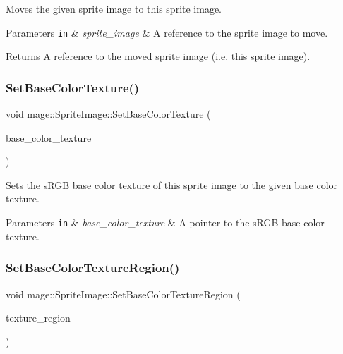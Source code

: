 Moves the given sprite image to this sprite image.


\begin{DoxyParams}[1]{Parameters}
\mbox{\tt in}  & {\em sprite\+\_\+image} & A reference to the sprite image to move. \\
\hline
\end{DoxyParams}
\begin{DoxyReturn}{Returns}
A reference to the moved sprite image (i.\+e. this sprite image). 
\end{DoxyReturn}
\hypertarget{classmage_1_1_sprite_image_a9fb3a39de1350e58b4019b541337ca13}{}\label{classmage_1_1_sprite_image_a9fb3a39de1350e58b4019b541337ca13} 
\subsubsection{\texorpdfstring{Set\+Base\+Color\+Texture()}{SetBaseColorTexture()}}
{\footnotesize\ttfamily void mage\+::\+Sprite\+Image\+::\+Set\+Base\+Color\+Texture (\begin{DoxyParamCaption}\item[{\hyperlink{namespacemage_a1e01ae66713838a7a67d30e44c67703e}{Shared\+Ptr}$<$ const \hyperlink{classmage_1_1_texture}{Texture} $>$}]{base\+\_\+color\+\_\+texture }\end{DoxyParamCaption})\hspace{0.3cm}{\ttfamily [noexcept]}}

Sets the s\+R\+GB base color texture of this sprite image to the given base color texture.


\begin{DoxyParams}[1]{Parameters}
\mbox{\tt in}  & {\em base\+\_\+color\+\_\+texture} & A pointer to the s\+R\+GB base color texture. \\
\hline
\end{DoxyParams}
\hypertarget{classmage_1_1_sprite_image_aa68e416669d05cf777c564b118b50fe5}{}\label{classmage_1_1_sprite_image_aa68e416669d05cf777c564b118b50fe5} 
\subsubsection{\texorpdfstring{Set\+Base\+Color\+Texture\+Region()}{SetBaseColorTextureRegion()}}
{\footnotesize\ttfamily void mage\+::\+Sprite\+Image\+::\+Set\+Base\+Color\+Texture\+Region (\begin{DoxyParamCaption}\item[{R\+E\+CT}]{texture\+\_\+region }\end{DoxyParamCaption})\hspace{0.3cm}{\ttfamily [noexcept]}}

